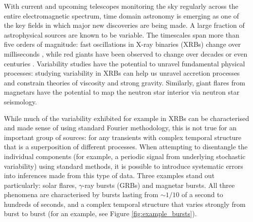 \documentclass[12pt]{emulateapj}
\begin{document}
With current and upcoming telescopes monitoring the sky regularly across the entire electromagnetic spectrum, time domain astronomy is emerging as one of the key fields in which major 
new discoveries are being made.  A large fraction of astrophysical sources are known to be variable. The timescales span more than five orders of magnitude: fast oscillations in 
X-ray binaries (XRBs) change over milliseconds \citep[e.g.][]{xrb_khzqpos}, while red giants have been observed to change over decades or even centuries \citep[e.g.][]{dasch_giants}. 
Variability studies have the potential to unravel fundamental physical processes: studying variability in XRBs can help us unravel accretion processes and constrain theories of viscosity and strong gravity. 
Similarly, giant flares from magnetars have the potential to map the neutron star interior via neutron star seismology. 

While much of the variability exhibited for example in XRBs can be characterised and made sense of using standard Fourier methodology, this is not true for an important group of sources: for any transients 
with complex temporal structure that is a superposition of different processes. When attempting to disentangle the individual components (for example, a periodic signal from underlying stochastic variability)
using standard methods, it is possible to introduce systematic errors into inferences made from this type of data. Three examples stand out particularly: solar flares, $\gamma$-ray bursts (GRBs) and magnetar bursts.  All three phenomena are characterised by bursts lasting from $\sim 1/10$ of a second to hundreds of seconds, and a 
complex temporal structure that varies strongly from burst to burst (for an example, see Figure \ref{fig:example_bursts}). 
\end{document}
